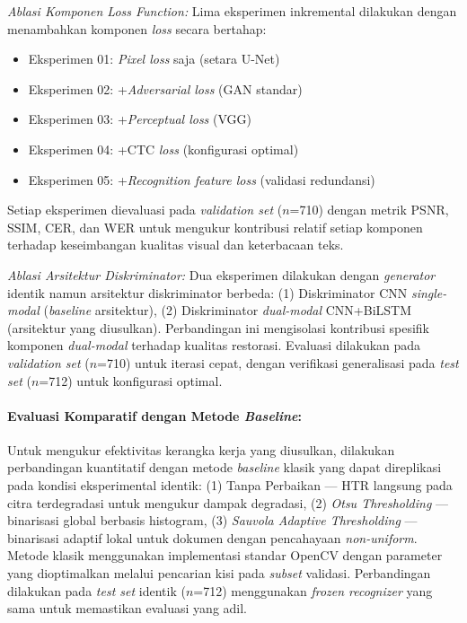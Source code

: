 \documentclass[12pt,a4paper]{article}
\begin{document}
\textit{Ablasi Komponen Loss Function:} Lima eksperimen inkremental dilakukan dengan menambahkan komponen \textit{loss} secara bertahap:
\begin{itemize}[leftmargin=1.5cm, nosep]
\item Eksperimen 01: \textit{Pixel loss} saja (setara U-Net)
\item Eksperimen 02: +\textit{Adversarial loss} (GAN standar)
\item Eksperimen 03: +\textit{Perceptual loss} (VGG)
\item Eksperimen 04: +CTC \textit{loss} (konfigurasi optimal)
\item Eksperimen 05: +\textit{Recognition feature loss} (validasi redundansi)
\end{itemize}
Setiap eksperimen dievaluasi pada \textit{validation set} ($n$=710) dengan metrik PSNR, SSIM, CER, dan WER untuk mengukur kontribusi relatif setiap komponen terhadap keseimbangan kualitas visual dan keterbacaan teks.

\textit{Ablasi Arsitektur Diskriminator:} Dua eksperimen dilakukan dengan \textit{generator} identik namun arsitektur diskriminator berbeda: (1) Diskriminator CNN \textit{single-modal} (\textit{baseline} arsitektur), (2) Diskriminator \textit{dual-modal} CNN+BiLSTM (arsitektur yang diusulkan). Perbandingan ini mengisolasi kontribusi spesifik komponen \textit{dual-modal} terhadap kualitas restorasi. Evaluasi dilakukan pada \textit{validation set} ($n$=710) untuk iterasi cepat, dengan verifikasi generalisasi pada \textit{test set} ($n$=712) untuk konfigurasi optimal.

\paragraph{Evaluasi Komparatif dengan Metode \textit{Baseline}:}
Untuk mengukur efektivitas kerangka kerja yang diusulkan, dilakukan perbandingan kuantitatif dengan metode \textit{baseline} klasik yang dapat direplikasi pada kondisi eksperimental identik: (1) Tanpa Perbaikan — HTR langsung pada citra terdegradasi untuk mengukur dampak degradasi, (2) \textit{Otsu Thresholding} — binarisasi global berbasis histogram, (3) \textit{Sauvola Adaptive Thresholding} — binarisasi adaptif lokal untuk dokumen dengan pencahayaan \textit{non-uniform}. Metode klasik menggunakan implementasi standar OpenCV dengan parameter yang dioptimalkan melalui pencarian kisi pada \textit{subset} validasi. Perbandingan dilakukan pada \textit{test set} identik ($n$=712) menggunakan \textit{frozen recognizer} yang sama untuk memastikan evaluasi yang adil.
\end{document}
